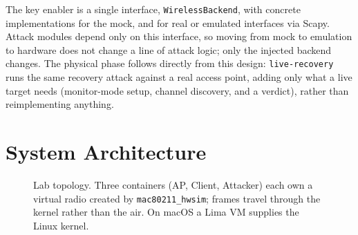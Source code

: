 \documentclass[11pt,letterpaper]{article}
\newcommand{\code}[1]{\texttt{\small #1}}
\begin{document}
The key enabler is a single interface, \code{WirelessBackend}, with concrete
implementations for the mock, and for real or emulated interfaces via Scapy.
Attack modules depend only on this interface, so moving from mock to emulation to
hardware does not change a line of attack logic; only the injected backend
changes. The physical phase follows directly from this design:
\code{live-recovery} runs the same recovery attack against a real access point,
adding only what a live target needs (monitor-mode setup, channel discovery, and
a verdict), rather than reimplementing anything.

\section{System Architecture}
\label{sec:architecture}

\begin{figure}[ht]
  \centering
  \caption{Lab topology. Three containers (AP, Client, Attacker) each own a
  virtual radio created by \code{mac80211\_hwsim}; frames travel through the
  kernel rather than the air. On macOS a Lima VM supplies the Linux kernel.}
  \label{fig:arch}
\end{figure}
\end{document}
